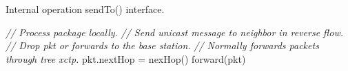 \begin{algorithm}[!t]
    \caption{Internal operation sendTo() interface.}
    \label{alg:1}
    \begin{algorithmic}[1]
        
                \STATE \textit{// Process package locally.}
                \STATE \textit{// Send unicast message to neighbor in reverse flow.}
            \ELSE
                \STATE \textit{// Drop pkt or forwards to the base station.}
            \ENDIF
        \ELSE
            \STATE \textit{// Normally forwards packets through tree \ac{xctp}.}
            \STATE pkt.nextHop = nexHop()
            \STATE forward(pkt)
        \ENDIF
    \end{algorithmic}
\end{algorithm}

